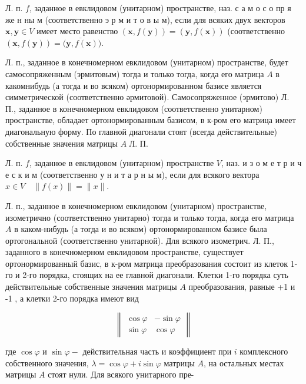 \documentclass[10pt]{article}
\begin{document}
Л. п. $f$, заданное в евклидовом (унитарном) пространстве, наз. с а м о с о пр я же н ны м (соответственно э р м и т о в ы м), если для всяких двух векторов $\boldsymbol{x}, \boldsymbol{y} \in V$ имеет место равенство $(\boldsymbol{x}, f(\boldsymbol{y}))=(\boldsymbol{y}, f(\boldsymbol{x}))$ (соответственно $(\boldsymbol{x}, f(\boldsymbol{y}))=\overline{(\boldsymbol{y}, f(\boldsymbol{x})})$.



Л. п., заданное в конечномерном евклидовом (унитарном) пространстве, будет самосопряженным (эрмитовым) тогда и только тогда, когда его матрица $A$ в какомнибудь (а тогда и во всяком) ортонормированном базисе является симметрической (соответственно әрмитовой). Самосопряженное (эрмитово) Л. П., заданное в конечномерном евклидовом (соответственно унитарном) пространстве, обладает ортонормированным базисом, в к-ром его матрица имеет диагональную форму. По главной диагонали стоят (всегда действительные) собственные значения матрицы $A$ Л. П.



Л. п. $f$, заданное в евклидовом (унитарном) пространстве $V$, наз. и з о м е т р и ч е с к и м (соответственно у н и т а р н ы м), если для всякого вектора $x \in V \quad\|f(x)\|=\|x\|$.



Л. п., заданное в конечномерном евклидовом (унитарном) пространстве, изометрично (соответственно унитарно) тогда и только тогда, когда его матрица $A$ в каком-нибудь (а тогда и во всяком) ортонормированном базисе была ортогональной (соответственно унитарной). Для всякого изометрич. Л. П., заданного в конечномерном евклидовом пространстве, существует ортонормированный базис, в к-ром матрица преобразования состоит из клеток 1-го и 2-го порядка, стоящих на ее главной диагонали. Клетки 1-го порядка суть действительные собственные значения матрицы $A$ преобразования, равные +1 и -1 , а клетки 2-го порядка имеют вид



\[

\left\|\begin{array}{rr}

\cos \varphi & -\sin \varphi \\

\sin \varphi & \cos \varphi

\end{array}\right\|

\]



где $\cos \varphi$ и $\sin \varphi-$ действительная часть и коэффициент при $i$ комплексного собственного значения, $\lambda=\cos \varphi+i \sin \varphi$ матрицы $A$, на остальных местах матрицы $A$ стоят нули. Для всякого унитарного пре-
\end{document}
